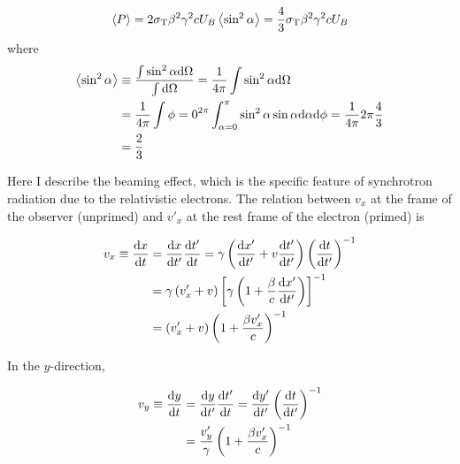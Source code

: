 \begin{equation}\label{eq:essential_radio5n38}
    \left\langle P\right\rangle = 2 \sigma_{\mathrm{T}} \beta^2 \gamma^2 c U_B\left\langle\sin^2 \alpha\right\rangle = \frac{4}{3}\sigma_{\mathrm{T}} \beta^2 \gamma^2 c U_B
\end{equation}
where
\begin{equation}\label{eq:essential_radio5n39}
    \begin{aligned}
    \left\langle\sin^2 \alpha\right\rangle & \equiv \frac{\int \sin^2 \alpha \mathrm{d} \Omega}{\int \mathrm{d} \Omega}=\frac{1}{4\pi} \int \sin^2 \alpha \mathrm{d} \Omega \\
                        &=\frac{1}{4\pi} \int {\phi=0}^{2\pi} \int_{\alpha=0}^{\pi} \sin^2 \alpha \sin \alpha \mathrm{d} \alpha \mathrm{d} \phi=\frac{1}{4\pi} 2 \pi \frac{4}{3} \\
                        &=\frac{2}{3}
    \end{aligned}
\end{equation}

Here I describe the beaming effect, which is the specific feature of synchrotron radiation due to the relativistic electrons.
The relation between $v_x$ at the frame of the observer (unprimed) and $v'_x$  at the rest frame of the electron (primed) is

\begin{equation}\label{eq:essential_radio5n43}
    \begin{aligned}
        v_x \equiv \frac{\mathrm{d} x}{\mathrm{d} t} &= \frac{\mathrm{d} x}{\mathrm{d} t^{\prime}} \frac{\mathrm{d} t^{\prime}}{\mathrm{d} t}=\gamma\left(\frac{\mathrm{d} x^{\prime}}{\mathrm{d} t^{\prime}}+v \frac{\mathrm{d} t^{\prime}}{\mathrm{d} t^{\prime}}\right)\left(\frac{\mathrm{d} t}{\mathrm{d} t^{\prime}}\right)^{-1} \\
                                       &=\gamma\left(v_x^{\prime}+v\right)\left[\gamma\left(1+\frac{\beta}{c} \frac{\mathrm{d} x^{\prime}}{\mathrm{d} t^{\prime}}\right)\right]^{-1} \\
                                       &=\left(v_x^{\prime}+v\right)\left(1+\frac{\beta v_x^{\prime}}{c}\right)^{-1}
    \end{aligned}
\end{equation}

In the $y$-direction,

\begin{equation}\label{eq:essential_radio5n46}
    \begin{aligned}
        v_y \equiv \frac{\mathrm{d} y}{\mathrm{d} t} &= \frac{\mathrm{d} y}{\mathrm{d} t^{\prime}} \frac{\mathrm{d} t^{\prime}}{\mathrm{d} t}=\frac{\mathrm{d} y^{\prime}}{\mathrm{d} t^{\prime}}\left(\frac{\mathrm{d} t}{\mathrm{d} t^{\prime}}\right)^{-1} \\
                                       &= \frac{v_y^{\prime}}{\gamma}\left(1+\frac{\beta v_x^{\prime}}{c}\right)^{-1}
    \end{aligned}
\end{equation}

